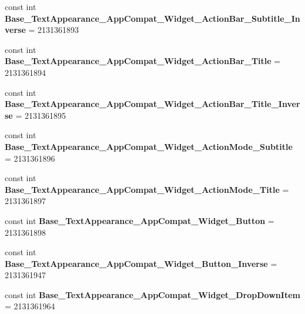 \begin{DoxyCompactItemize}
const int {\bfseries Base\+\_\+\+Text\+Appearance\+\_\+\+App\+Compat\+\_\+\+Widget\+\_\+\+Action\+Bar\+\_\+\+Subtitle\+\_\+\+Inverse} = 2131361893
\item 
\mbox{\label{classXaria_1_1Resource_1_1Style_a06ab6d52f97cfcc8b5951dbcc908d482}} 
const int {\bfseries Base\+\_\+\+Text\+Appearance\+\_\+\+App\+Compat\+\_\+\+Widget\+\_\+\+Action\+Bar\+\_\+\+Title} = 2131361894
\item 
\mbox{\label{classXaria_1_1Resource_1_1Style_a5d709873a16d21d252ea04c2091de838}} 
const int {\bfseries Base\+\_\+\+Text\+Appearance\+\_\+\+App\+Compat\+\_\+\+Widget\+\_\+\+Action\+Bar\+\_\+\+Title\+\_\+\+Inverse} = 2131361895
\item 
\mbox{\label{classXaria_1_1Resource_1_1Style_a28d8fefb480801fdfe0ca3d4ce4ad76d}} 
const int {\bfseries Base\+\_\+\+Text\+Appearance\+\_\+\+App\+Compat\+\_\+\+Widget\+\_\+\+Action\+Mode\+\_\+\+Subtitle} = 2131361896
\item 
\mbox{\label{classXaria_1_1Resource_1_1Style_a1f380ae8c4a16bd03add660b460385ac}} 
const int {\bfseries Base\+\_\+\+Text\+Appearance\+\_\+\+App\+Compat\+\_\+\+Widget\+\_\+\+Action\+Mode\+\_\+\+Title} = 2131361897
\item 
\mbox{\label{classXaria_1_1Resource_1_1Style_a5de1e3a415cbffca49fbbb9b90a1113e}} 
const int {\bfseries Base\+\_\+\+Text\+Appearance\+\_\+\+App\+Compat\+\_\+\+Widget\+\_\+\+Button} = 2131361898
\item 
\mbox{\label{classXaria_1_1Resource_1_1Style_a44f6ec8563d75aa07720882761ce176e}} 
const int {\bfseries Base\+\_\+\+Text\+Appearance\+\_\+\+App\+Compat\+\_\+\+Widget\+\_\+\+Button\+\_\+\+Inverse} = 2131361947
\item 
\mbox{\label{classXaria_1_1Resource_1_1Style_a2bc1cbebbf20eb67392ed78676e00c8b}} 
const int {\bfseries Base\+\_\+\+Text\+Appearance\+\_\+\+App\+Compat\+\_\+\+Widget\+\_\+\+Drop\+Down\+Item} = 2131361964
\item 
\mbox{\label{classXaria_1_1Resource_1_1Style_a2ddb8bd52bd3daad9c609b2f8e4962fd}} 

\end{DoxyCompactItemize}
